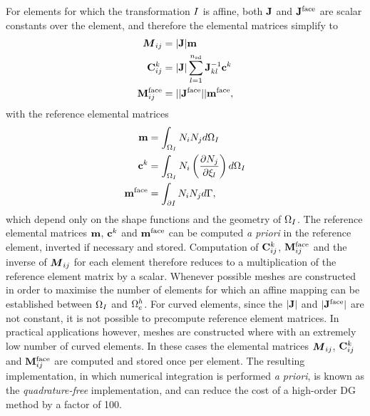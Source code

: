 For elements for which the transformation $I$ is affine, both $\mathbf{J}$ and $\mathbf{J}^{\textrm{face}}$ are scalar constants over the element, and therefore the elemental matrices simplify to
\begin{align*}
\boldsymbol{M}_{ij} &= |\mathbf{J}| \mathbf{m} \\
\mathbf{C}^{k}_{ij} &= |\mathbf{J}|
                               \sum_{l=1}^{n_\textrm{sd}}
                               \mathbf{J}_{kl}^{-1}
                               \mathbf{c}^k \\
\mathbf{M}^{\textrm{face}}_{ij} &= || \mathbf{J}^{\textrm{face}} || \mathbf{m}^{\textrm{face}}
,
\end{align*}
with the reference elemental matrices
\begin{align*}
\mathbf{m} &= \int_{\Omega_{I}} N_i N_j d\Omega_{I} \\
\mathbf{c}^k &= \int_{\Omega_{I}} N_i
                             \left(
                               \frac{\partial N_j}{\partial \xi_{l}}
                             \right)
                             d\Omega_{I} \\
\mathbf{m}^{\textrm{face}} &= \int_{\partial I} N_i N_j d\Gamma
,
\end{align*}
which depend only on the shape functions and the geometry of $\Omega_{I}$. The reference elemental matrices $\mathbf{m}$, $\mathbf{c}^k$ and $\mathbf{m}^{\textrm{face}}$ can be computed \textit{a priori} in the reference element, inverted if necessary and stored. Computation of $\mathbf{C}^{k}_{ij}$, $\mathbf{M}^{\textrm{face}}_{ij}$ and the inverse of $\boldsymbol{M}_{ij}$ for each element therefore reduces to a multiplication of the reference element matrix by a scalar. Whenever possible meshes are constructed in order to maximise the number of elements for which an affine mapping can be established between $\Omega_{I}$ and $\Omega_e^{h}$. For curved elements, since the $|\mathbf{J}|$ and $|\mathbf{J}^{\textrm{face}}|$ are not constant, it is not possible to precompute reference element matrices. In practical applications however, meshes are constructed where with an extremely low number of curved elements. In these cases the elemental matrices $\boldsymbol{M}_{ij}$, $\mathbf{C}^{k}_{ij}$ and $\mathbf{M}^{\textrm{face}}_{ij}$ are computed and stored once per element.
The resulting implementation, in which numerical integration is performed \textit{a priori}, is known as the \textit{quadrature-free} implementation\cite{DGPaper:42}, and can reduce the cost of a high-order DG method by a factor of 100\cite{DGPaper:41}.


